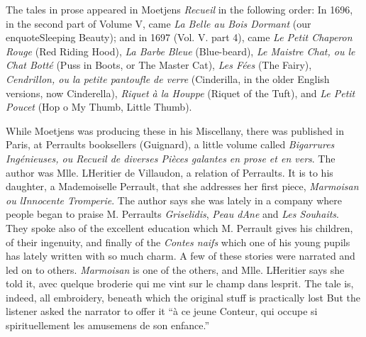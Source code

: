 \documentclass[14pt,a4paper]{memoir}
\begin{document}
The tales in prose appeared in Moetjens\textquotesingle{} \emph{Recueil}
in the following order: In 1696, in the second part of Volume V, came
\emph{La Belle au Bois Dormant} (our enquote{Sleeping
Beauty}); and in 1697 (Vol. V. part 4), came \emph{Le
Petit Chaperon Rouge} (\textquotesingle Red Riding
Hood\textquotesingle), \emph{La Barbe Bleue}
(\textquotesingle Blue-beard\textquotesingle), \emph{Le Maistre Chat, ou
le Chat Botté} (\textquotesingle Puss in Boots,\textquotesingle{} or
\textquotesingle The Master Cat\textquotesingle), \emph{Les Fées}
(\textquotesingle The Fairy\textquotesingle), \emph{Cendrillon, ou la
petite pantoufle de verre}
(\textquotesingle Cinderilla,\textquotesingle{} in the older English
versions, now \textquotesingle Cinderella\textquotesingle), \emph{Riquet
à la Houppe} (\textquotesingle Riquet of the Tuft\textquotesingle), and
\emph{Le Petit Poucet} (\textquotesingle Hop o\textquotesingle{} My
Thumb, Little Thumb\textquotesingle).

While Moetjens was producing these in his Miscellany, there was
published in Paris, at Perrault\textquotesingle s
bookseller\textquotesingle s (Guignard), a little volume called
\emph{Bigarrures Ingénieuses, ou Recueil de diverses Pièces galantes en
prose et en vers}. The author was Mlle. L\textquotesingle Heritier de
Villaudon, a relation of Perrault\textquotesingle s. It is to his
daughter, a Mademoiselle Perrault, that she addresses her first piece,
\emph{Marmoisan ou l\textquotesingle Innocente Tromperie}. The author
says she was lately in a company where people began to praise M.
Perrault\textquotesingle s \emph{Griselidis}, \emph{Peau
d\textquotesingle Ane} and \emph{Les Souhaits}. They spoke also of
\textquotesingle the excellent education which M. Perrault gives his
children, of their ingenuity, and finally of the \emph{Contes naifs}
which one of his young pupils has lately written with so much charm. A
few of these stories were narrated and led on to
others.\textquotesingle{} \emph{Marmoisan} is one of the others, and
Mlle. L\textquotesingle Heritier says she told it, \textquotesingle avec
quelque broderie qui me vint sur le champ dans
l\textquotesingle esprit.\textquotesingle{} The tale is, indeed, all
embroidery, beneath which the original stuff is practically
lost
But the listener asked the narrator to offer it \enquote{à ce
jeune Conteur, qui occupe si spirituellement les amusemens de son
enfance.}
\end{document}
